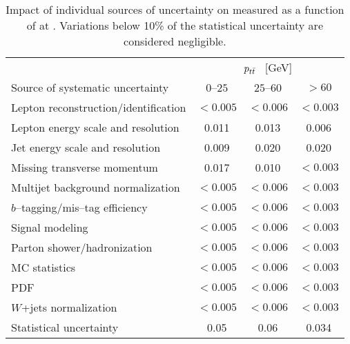 \begin{table}[!htbp]\centering
\begin{tabular}{l c c c}
\toprule
 &\multicolumn{3}{c}{$p_{t\bar{t}}{}$ ~[GeV]} \\
Source of systematic uncertainty           &    $0$--$25$           &        $25$--$60$         &  $>60$    \\
\midrule
Lepton reconstruction/identification              & $<0.005$ & $<0.006$ & $<0.003$ \\
Lepton energy scale and resolution                & 0.011 & 0.013 & 0.006   \\
Jet energy scale and resolution                   & 0.009 & 0.020 & 0.020   \\
Missing transverse momentum & 0.017 & 0.010 & $<0.003$ \\
Multijet background normalization    & $<0.005$ & $<0.006$ & $<0.003$  \\
$b$--tagging/mis--tag efficiency                & $<0.005$ & $<0.006$ & $<0.003$  \\
Signal modeling                        & $<0.005$ & $<0.006$ & $<0.003$  \\
Parton shower/hadronization             & $<0.005$ & $<0.006$ & $<0.003$  \\
MC statistics                 & $<0.005$ & $<0.006$ & $<0.003$  \\
PDF                                     & $<0.005$ & $<0.006$ & $<0.003$  \\
$W$+jets normalization        & $<0.005$ & $<0.006$ & $<0.003$  \\
\midrule
Statistical uncertainty                 & 0.05   &        0.06      &        0.034     \\
\bottomrule
\end{tabular}
\caption{Impact of individual sources of uncertainty on
  \ac{} measured as a function of \pttt{} at \seventev{}. Variations below 10\%
  of the statistical uncertainty are considered negligible.}
\label{table:Systematics_pttt}
\end{table}

